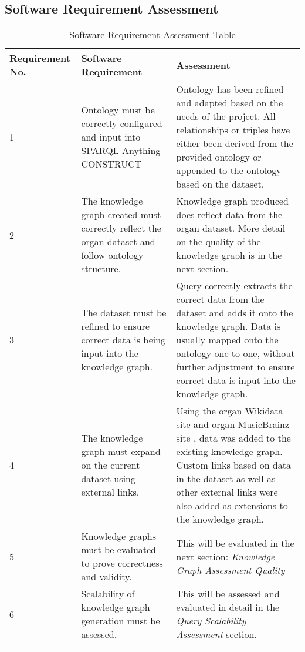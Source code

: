 \subsection{Software Requirement Assessment}
\begin{longtable}{|p{2.25cm}|p{5.5cm}|p{5.5cm}|}

\hline
\textbf{Requirement No.} & \textbf{Software Requirement} & \textbf{Assessment}\\
\hline

1& 
Ontology must be correctly configured and input into SPARQL-Anything CONSTRUCT &
Ontology has been refined and adapted based on the needs of the project. All relationships or triples have either been derived from the provided ontology or appended to the ontology based on the dataset. \\
\hline

2&
The knowledge graph created must correctly reflect the organ dataset and follow ontology structure. &
Knowledge graph produced does reflect data from the organ dataset. More detail on the quality of the knowledge graph is in the next section. \\
\hline

3&
The dataset must be refined to ensure correct data is being input into the knowledge graph. &
Query correctly extracts the correct data from the dataset and adds it onto the knowledge graph. Data is usually mapped onto the ontology one-to-one, without further adjustment to ensure correct data is input into the knowledge graph. \\
\hline

4&
The knowledge graph must expand on the current dataset using external links. &
Using the organ Wikidata site \cite{organwikidata} and organ MusicBrainz site \cite{organmusicbrainz}, data was added to the existing knowledge graph. Custom links based on data in the dataset as well as other external links were also added as extensions to the knowledge graph. \\
\hline

5&
Knowledge graphs must be evaluated to prove correctness and validity. &
This will be evaluated in the next section: \textit{Knowledge Graph Assessment Quality} \\ 
\hline

6&
Scalability of knowledge graph generation must be assessed. &
This will be assessed and evaluated in detail in the \textit{Query Scalability Assessment} section. \\ 
\hline
\caption{Software Requirement Assessment Table}
\end{longtable}

